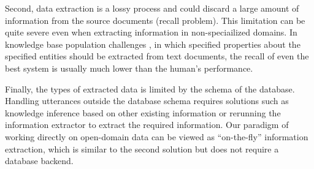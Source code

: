 Second, data extraction is a lossy process
and could discard a large amount of information from the source documents
(recall problem).
This limitation can be quite severe even when extracting
information in non-speciailized domains.
In knowledge base population challenges \cite{ji2011knowledge,ellis2015tackbp},
in which specified properties about the specified entities
should be extracted from text documents,
the recall of even the best system is usually much lower
than the human's performance.

Finally,
the types of extracted data
is limited by the schema of the database.
Handling utterances outside the database schema
requires solutions such as knowledge inference
based on other existing information \cite{nickel2011three,riedel13universal,neelakantan2015compositional}
or rerunning the information extractor to extract the required information.
Our paradigm of working directly on open-domain data
can be viewed as ``on-the-fly'' information extraction,
which is similar to the second solution but does not require
a database backend.